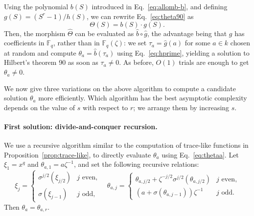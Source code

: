 \documentclass{mcom-l}
\theoremstyle{plain}
\theoremstyle{definition}
\newcommand{\F}{\ensuremath{\mathbb{F}}}
\newcounter{algorithm}
\begin{document}
Using the polynomial $b(S)$ introduced in Eq.~\eqref{eq:allomb-b},
and defining
$g(S)=(S^r-1)/h(S)$, we can rewrite Eq.~\eqref{eq:theta90} as
\begin{equation}
  \label{eq:theta90bis}
  \Theta(S) = b(S) \cdot g(S).
\end{equation}
Then, the morphism $\hat\Theta$ can be evaluated
as $\hat{b}\circ\hat{g}$, the advantage being that $g$ has
coefficients in $\F_q$, rather than in $\F_q(\zeta)$: we set $\tau_a = \hat{g}(a)$ for some $a\in k$ chosen at random
and compute $\theta_a = \hat{b}(\tau_a)$ using Eq.~\eqref{eq:hprime},
yielding a solution to Hilbert's theorem 90 as soon as $\tau_a \neq 0$.
As before, $O(1)$ trials are enough to get $\theta_a \neq 0$.



We now give three variations on the above algorithm to compute 
a candidate solution $\theta_a$ more efficiently.
Which algorithm has the best asymptotic complexity depends on the
value of $s$ with respect to $r$; we arrange them by increasing $s$.



\paragraph{\bf First solution: divide-and-conquer recursion.}
We use a recursive algorithm similar to the computation of trace-like
functions in Proposition~\ref{prop:trace-like}, to directly evaluate $\theta_a$
using Eq.~\eqref{eq:thetaa}.  Let $\xi_1=x^q$ and
$\theta_{a,1}=a\zeta^{-1}$, and set the following recursive relations:
\begin{equation}
\label{eq:theta-recursive}
\xi_j = 
\begin{cases}
\sigma^{j/2}(\xi_{j / 2}) & j \text{ even,} \\
\sigma(\xi_{j - 1}) & j \text{ odd,}
\end{cases} \quad
\theta_{a, j} = 
\begin{cases}
\theta_{a, j / 2} + \zeta^{-j / 2}\sigma^{j / 2}(\theta_{a, j / 2})& j \text{ even,} \\
(a + \sigma(\theta_{a, j - 1}))\zeta^{-1} & j \text{ odd.}
\end{cases}
\end{equation}
Then $\theta_a=\theta_{a,r}$.
\end{document}
